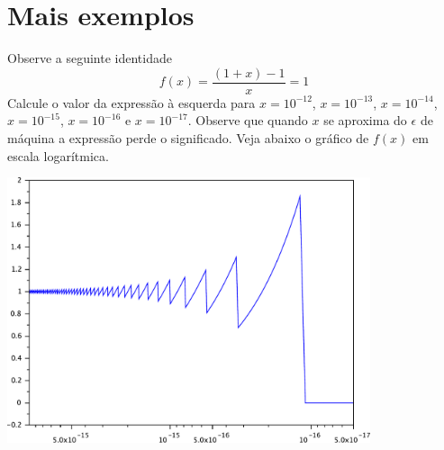 \documentclass[main.tex]{subfiles}
\begin{document}
\section{Mais exemplos}

\begin{ex}Observe a seguinte identidade
$$
f(x)=\frac{(1+x)-1}{x}=1
$$
Calcule o valor da expressão à esquerda para $x=10^{-12}$, $x=10^{-13}$, $x=10^{-14}$, $x=10^{-15}$, $x=10^{-16}$ e $x=10^{-17}$. Observe que quando $x$ se aproxima do $\epsilon$ de máquina a expressão perde o significado. Veja abaixo o gráfico de $f(x)$ em escala logarítmica.

\includegraphics[width=0.8\textwidth]{./cap_aritmetica/pics/cancelamento_0}
\end{ex}
\end{document}
